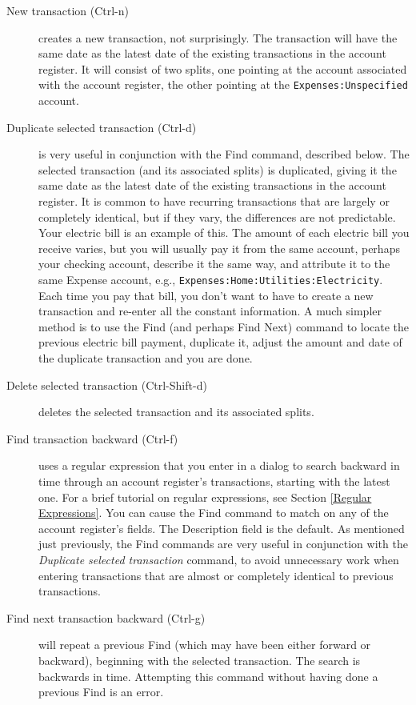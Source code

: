 \documentclass{report}
\begin{document}
\begin{description}
\item [New transaction (Ctrl-n)] creates a new transaction, not surprisingly. The transaction will have the same date as the latest date of the existing transactions in the account register. It will consist of two splits, one pointing at the account associated with the account register, the other pointing at the \verb$Expenses:Unspecified$ account.
\item [Duplicate selected transaction (Ctrl-d)] is very useful in conjunction with the Find command, described below. The selected transaction (and its associated splits) is duplicated, giving it the same date as the latest date of the existing transactions in the account register. It is common to have recurring transactions that are largely or completely identical, but if they vary, the differences are not predictable. Your electric bill is an example of this. The amount of each electric bill you receive varies, but you will usually pay it from the same account, perhaps your checking account, describe it the same way, and attribute it to the same Expense account, e.g., \verb$Expenses:Home:Utilities:Electricity$.  Each time you pay that bill, you don't want to have to create a new transaction and re-enter all the constant information. A much simpler method is to use the Find (and perhaps Find Next) command to locate the previous electric bill payment, duplicate it, adjust the amount and date of the duplicate transaction and you are done.
\item [Delete selected transaction (Ctrl-Shift-d)] deletes the selected transaction and its associated splits.
\item [Find transaction backward (Ctrl-f)] uses a regular expression that you enter in a dialog to search backward in time through an account register's transactions, starting with the latest one. For a brief tutorial on regular expressions, see Section \ref{Regular Expressions}. You can cause the Find command to match on any of the account register's fields. The Description field is the default. As mentioned just previously, the Find commands are very useful in conjunction with the \emph{Duplicate selected transaction} command, to avoid unnecessary work when entering transactions that are almost or completely identical to previous transactions.
\item [Find next transaction backward (Ctrl-g)] will repeat a previous Find (which may have been either forward or backward), beginning with the selected transaction. The search is backwards in time. Attempting this command without having done a previous Find is an error.

\end{description}
\end{document}
